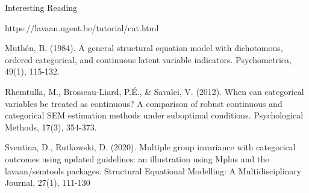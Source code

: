 \documentclass[10pt]{beamer}\usepackage[]{graphicx}\usepackage[]{xcolor}
\begin{document}

%	
%	
%


\begin{frame}{Interesting Reading}
	
	https://lavaan.ugent.be/tutorial/cat.html
	
	\vspace{5mm}
	
	Muthén, B. (1984). A general structural equation model with dichotomous, ordered categorical, and continuous latent variable indicators. Psychometrica, 49(1), 115-132.
	
	\vspace{5mm}
	
	Rhemtulla, M., Brosseau-Liard, P.É., \& Savalei, V. (2012). When can categorical variables be treated as continuous? A comparison of robust continuous and categorical SEM estimation methods under suboptimal conditions. Psychological Methods, 17(3), 354-373. 
	
	\vspace{5mm}
	
	Sventina, D., Rutkowski, D. (2020). Multiple group invariance with categorical outcomes using updated guidelines: an illustration using Mplus and the lavaan/semtools packages. Structural Equational Modelling: A Multidisciplinary Journal, 27(1), 111-130

\end{frame}
%
%
\end{document}
